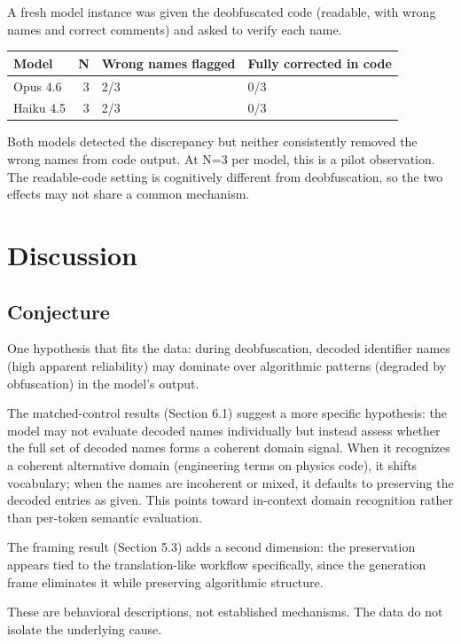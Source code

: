\documentclass[11pt]{article}
\begin{document}
A fresh model instance was given the deobfuscated code (readable, with
wrong names and correct comments) and asked to verify each name.

\begin{table}[ht]
\centering
\small
\begin{tabular}{@{}lrll@{}}
\toprule
Model & N & Wrong names flagged & Fully corrected in code \\
\midrule
Opus 4.6 & 3 & 2/3 & 0/3 \\
Haiku 4.5 & 3 & 2/3 & 0/3 \\
\bottomrule
\end{tabular}
\end{table}

Both models detected the discrepancy but neither consistently removed
the wrong names from code output. At N=3 per model, this is a pilot
observation. The readable-code setting is cognitively different from
deobfuscation, so the two effects may not share a common mechanism.

\section{Discussion}

\subsection{Conjecture}

One hypothesis that fits the data: during deobfuscation,
decoded identifier names (high apparent reliability) may dominate
over algorithmic patterns (degraded by obfuscation) in the model's
output.

The matched-control results (Section 6.1) suggest a more specific
hypothesis: the model may not evaluate decoded names individually
but instead assess whether the full set of decoded names forms a
coherent domain signal. When it recognizes a coherent alternative
domain (engineering terms on physics code), it shifts vocabulary;
when the names are incoherent or mixed, it defaults to preserving
the decoded entries as given. This points toward in-context domain recognition rather than
per-token semantic evaluation.

The framing result (Section 5.3) adds a second dimension: the
preservation appears tied to the translation-like workflow
specifically, since the generation frame eliminates it while
preserving algorithmic structure.

These are behavioral descriptions, not established mechanisms.
The data do not isolate the underlying cause.
\end{document}
